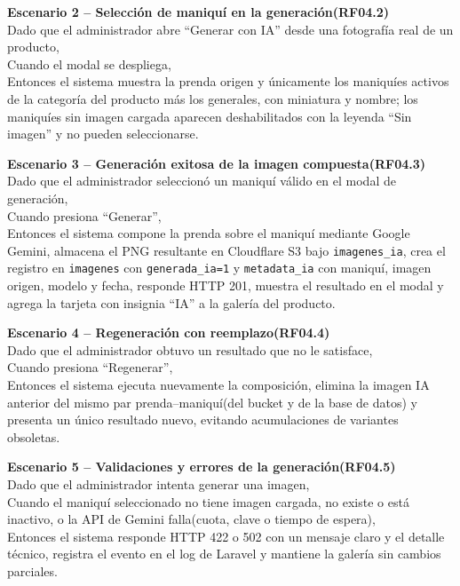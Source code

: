 \documentclass[12pt,a4paper]{article}
\begin{document}
\vspace{0.3em}

\textbf{Escenario 2 -- Selección de maniquí en la generación(RF04.2)}\\
Dado que el administrador abre ``Generar con IA'' desde una fotografía real de un producto,\\
Cuando el modal se despliega,\\
Entonces el sistema muestra la prenda origen y únicamente los maniquíes activos de la categoría del producto más los generales, con miniatura y nombre; los maniquíes sin imagen cargada aparecen deshabilitados con la leyenda ``Sin imagen'' y no pueden seleccionarse.

\vspace{0.3em}

\textbf{Escenario 3 -- Generación exitosa de la imagen compuesta(RF04.3)}\\
Dado que el administrador seleccionó un maniquí válido en el modal de generación,\\
Cuando presiona ``Generar'',\\
Entonces el sistema compone la prenda sobre el maniquí mediante Google Gemini, almacena el PNG resultante en Cloudflare S3 bajo \texttt{imagenes\_ia}, crea el registro en \texttt{imagenes} con \texttt{generada\_ia=1} y \texttt{metadata\_ia} con maniquí, imagen origen, modelo y fecha, responde HTTP 201, muestra el resultado en el modal y agrega la tarjeta con insignia ``IA'' a la galería del producto.

\vspace{0.3em}

\textbf{Escenario 4 -- Regeneración con reemplazo(RF04.4)}\\
Dado que el administrador obtuvo un resultado que no le satisface,\\
Cuando presiona ``Regenerar'',\\
Entonces el sistema ejecuta nuevamente la composición, elimina la imagen IA anterior del mismo par prenda--maniquí(del bucket y de la base de datos) y presenta un único resultado nuevo, evitando acumulaciones de variantes obsoletas.

\vspace{0.3em}

\textbf{Escenario 5 -- Validaciones y errores de la generación(RF04.5)}\\
Dado que el administrador intenta generar una imagen,\\
Cuando el maniquí seleccionado no tiene imagen cargada, no existe o está inactivo, o la API de Gemini falla(cuota, clave o tiempo de espera),\\
Entonces el sistema responde HTTP 422 o 502 con un mensaje claro y el detalle técnico, registra el evento en el log de Laravel y mantiene la galería sin cambios parciales.
\end{document}
